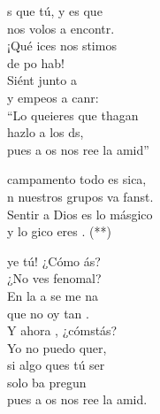 \begin{cancion}%
	s que tú, y es que\\
	nos volos a encontr.\\
	¡Qué ices nos stimos\\
	de po hab!\\
	Siént junto a \\
	y empeos a canr:\\
	“Lo queieres que thagan\\
	hazlo  a los ds, \\
	pues a os nos ree la amid”\\
	\begin{chorus}%
	campamento todo es sica,\\
	n nuestros grupos va fanst.\\
	Sentir a Dios es lo másgico \\
	y lo gico eres . (**)  \\
	\end{chorus}%
	ye tú! ¿Cómo ás?\\
	¿No ves fenomal?\\
	En la a se me na\\
	que no oy tan .\\
	Y ahora , ¿cómstás?\\
	Yo no puedo quer,\\
	si algo ques tú ser\\
	solo ba pregun\\
	pues a os nos ree la amid.\\
\end{cancion}%
